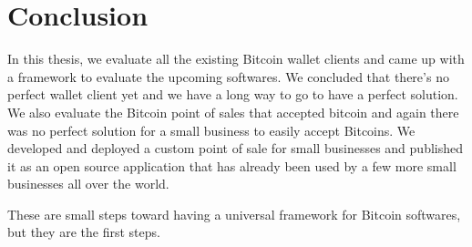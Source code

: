 
\chapter{Conclusion}

In this thesis, we evaluate all the existing Bitcoin wallet clients and came up with a framework to evaluate the upcoming softwares. We concluded that there's no perfect wallet client yet and we have a long way to go to have a perfect solution. We also evaluate the Bitcoin point of sales that accepted bitcoin and again there was no perfect solution for a small business to easily accept Bitcoins. We developed and deployed a custom point of sale for small businesses and published it as an open source application that has already been used by a few more small businesses all over the world.

These are small steps toward having a universal framework for Bitcoin softwares, but they are the first steps.

 